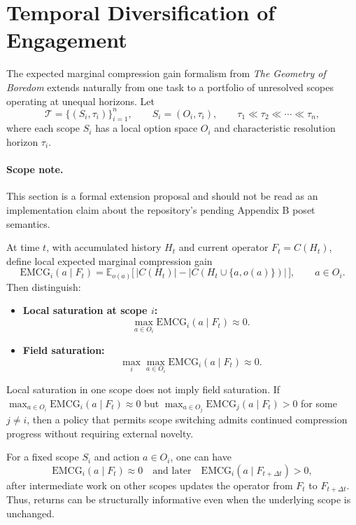 \section{Temporal Diversification of Engagement}

The expected marginal compression gain formalism from \emph{The Geometry of Boredom}
extends naturally from one task to a portfolio of unresolved scopes operating at unequal
horizons. Let
\[
\mathcal{T}=\{(S_i,\tau_i)\}_{i=1}^n,\qquad S_i=(O_i,\tau_i),\qquad \tau_1\ll\tau_2\ll\cdots\ll\tau_n,
\]
where each scope $S_i$ has a local option space $O_i$ and characteristic resolution horizon
$\tau_i$.

\paragraph{Scope note.}
This section is a formal extension proposal and should not be read as an implementation claim
about the repository's pending Appendix B poset semantics.

At time $t$, with accumulated history $H_t$ and current operator $F_t=C(H_t)$, define local
expected marginal compression gain
\[
\mathrm{EMCG}_i(a\mid F_t)=\mathbb{E}_{o(a)}\big[\,|C(H_t)|-|C(H_t\cup\{a,o(a)\})|\,\big],\qquad a\in O_i.
\]
Then distinguish:
\begin{itemize}
  \item \textbf{Local saturation at scope $i$:}
  \[
  \max_{a\in O_i}\mathrm{EMCG}_i(a\mid F_t)\approx 0.
  \]
  \item \textbf{Field saturation:}
  \[
  \max_i\max_{a\in O_i}\mathrm{EMCG}_i(a\mid F_t)\approx 0.
  \]
\end{itemize}

\begin{proposition}
Local saturation in one scope does not imply field saturation. If
$\max_{a\in O_i}\mathrm{EMCG}_i(a\mid F_t)\approx0$ but
$\max_{a\in O_j}\mathrm{EMCG}_j(a\mid F_t)>0$ for some $j\neq i$, then a policy that permits
scope switching admits continued compression progress without requiring external novelty.
\end{proposition}

\begin{proposition}
For a fixed scope $S_i$ and action $a\in O_i$, one can have
\[
\mathrm{EMCG}_i(a\mid F_t)\approx0\quad\text{and later}\quad
\mathrm{EMCG}_i(a\mid F_{t+\Delta t})>0,
\]
after intermediate work on other scopes updates the operator from $F_t$ to $F_{t+\Delta t}$.
Thus, returns can be structurally informative even when the underlying scope is unchanged.
\end{proposition}

